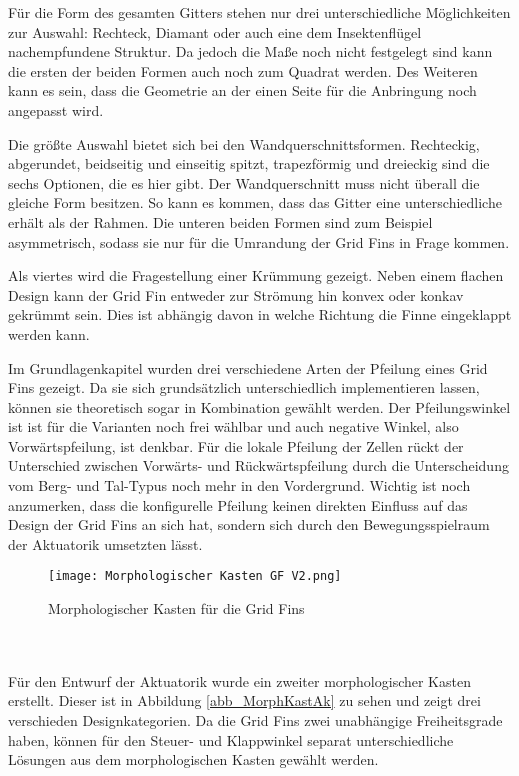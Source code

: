 Für die Form des gesamten Gitters stehen nur drei unterschiedliche Möglichkeiten zur Auswahl: Rechteck, Diamant oder auch eine dem Insektenflügel nachempfundene Struktur. Da jedoch die Maße noch nicht festgelegt sind kann die ersten der beiden Formen auch noch zum Quadrat werden. Des Weiteren kann es sein, dass die Geometrie an der einen Seite für die Anbringung noch angepasst wird.

Die größte Auswahl bietet sich bei den Wandquerschnittsformen. Rechteckig, abgerundet, beidseitig und einseitig spitzt, trapezförmig und dreieckig sind die sechs Optionen, die es hier gibt. Der Wandquerschnitt muss nicht überall die gleiche Form besitzen. So kann es kommen, dass das Gitter eine unterschiedliche erhält als der Rahmen. Die unteren beiden Formen sind zum Beispiel asymmetrisch, sodass sie nur für die Umrandung der Grid Fins in Frage kommen.

Als viertes wird die Fragestellung einer Krümmung gezeigt. Neben einem flachen Design kann der Grid Fin entweder zur Strömung hin konvex oder konkav gekrümmt sein. Dies ist abhängig davon in welche Richtung die Finne eingeklappt werden kann.

Im Grundlagenkapitel wurden drei verschiedene Arten der Pfeilung eines Grid Fins gezeigt. Da sie sich grundsätzlich unterschiedlich implementieren lassen, können sie theoretisch sogar in Kombination gewählt werden. Der Pfeilungswinkel ist ist für die Varianten noch frei wählbar und auch negative Winkel, also Vorwärtspfeilung, ist denkbar. Für die lokale Pfeilung der Zellen rückt der Unterschied zwischen Vorwärts- und Rückwärtspfeilung durch die Unterscheidung vom Berg- und Tal-Typus noch mehr in den Vordergrund. Wichtig ist noch anzumerken, dass die konfigurelle Pfeilung keinen direkten Einfluss auf das Design der Grid Fins an sich hat, sondern sich durch den Bewegungsspielraum der Aktuatorik umsetzten lässt.
\begin{figure}[h]
	\centering
	\texttt{[image: Morphologischer Kasten GF V2.png]}
	\caption{Morphologischer Kasten für die Grid Fins}
	\label{abb_MorphKastGF}
\end{figure}\\~\\
Für den Entwurf der Aktuatorik wurde ein zweiter morphologischer Kasten erstellt. Dieser ist in Abbildung \ref{abb_MorphKastAk} zu sehen und zeigt drei verschieden Designkategorien. Da die Grid Fins zwei unabhängige Freiheitsgrade haben, können für den Steuer- und Klappwinkel separat unterschiedliche Lösungen aus dem morphologischen Kasten gewählt werden.

